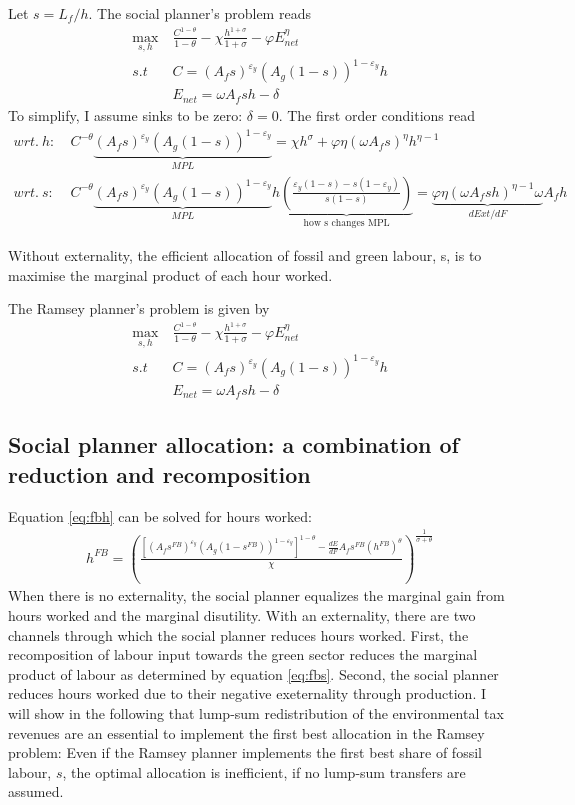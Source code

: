 Let $s=L_f/h$. The social planner's problem reads
\begin{align}
\underset{s, h}{\max}\ & \frac{C^{1-\theta}}{1-\theta}-\chi \frac{h^{1+\sigma}}{1+\sigma}-\varphi E_{net}^{\eta}\\
s.t\ \ & C=\left(A_fs\right)^{\varepsilon_y}\left(A_g(1-s)\right)^{1-\varepsilon_y}h\\
& E_{net}=\omega A_fsh-\delta
\end{align}
To simplify, I assume sinks to be zero: $\delta=0$.
The first order conditions read
\begin{align}
wrt.\ h:\ & C^{-\theta}\underbrace{(A_fs)^{\varepsilon_y}(A_g(1-s))^{1-\varepsilon_y}}_{MPL}=\chi h^\sigma+\varphi \eta (\omega A_f s)^\eta h^{\eta-1}\label{eq:fbh}\\
wrt.\ s:\ & C^{-\theta}\underbrace{(A_fs)^{\varepsilon_y}(A_g(1-s))^{1-\varepsilon_y}}_{MPL}h\underbrace{\left(\frac{\varepsilon_y(1-s)-s(1-\varepsilon_y)}{s(1-s)}\right)}_{\text{how s changes MPL}}=\underbrace{\varphi \eta (\omega A_f s h)^{\eta-1}\omega }_{dExt/dF} A_f h \label{eq:fbs}
\end{align}

Without externality, the efficient allocation of fossil and green labour, s, is to maximise the marginal product of each hour worked.

The Ramsey planner's problem is given by
\begin{align}
\underset{s, h}{\max}\ & \frac{C^{1-\theta}}{1-\theta}-\chi \frac{h^{1+\sigma}}{1+\sigma}-\varphi E_{net}^{\eta}\\
s.t\ \ & C=\left(A_fs\right)^{\varepsilon_y}\left(A_g(1-s)\right)^{1-\varepsilon_y}h\\
& E_{net}=\omega A_fsh-\delta
\end{align}

\subsection{Social planner allocation: a combination of reduction and recomposition}
Equation \ref{eq:fbh} can be solved for hours worked:
\begin{align}
h^{FB}=\left(\frac{\left[(A_f s^{FB})^{\varepsilon_y}(A_g(1-s^{FB}))^{1-\varepsilon_y}\right]^{1-\theta}-\frac{dE}{dF}A_f s^{FB} \left(h^{FB}\right)^\theta}{\chi}\right)^\frac{1}{\sigma+ \theta}
\end{align}
When there is no externality, the social planner equalizes the marginal gain from hours worked and the marginal disutility. With an externality, there are two channels through which the social planner reduces hours worked. First, the recomposition of labour input towards the green sector reduces the marginal product of labour as determined by equation \ref{eq:fbs}. Second, the social planner reduces hours worked due to their negative exeternality through production. I will show in the following that lump-sum redistribution of the environmental tax revenues are an essential to implement the first best allocation in the Ramsey problem: Even if the Ramsey planner implements the first best share of fossil labour, $s$, the optimal allocation is inefficient, if no lump-sum transfers are assumed. 


